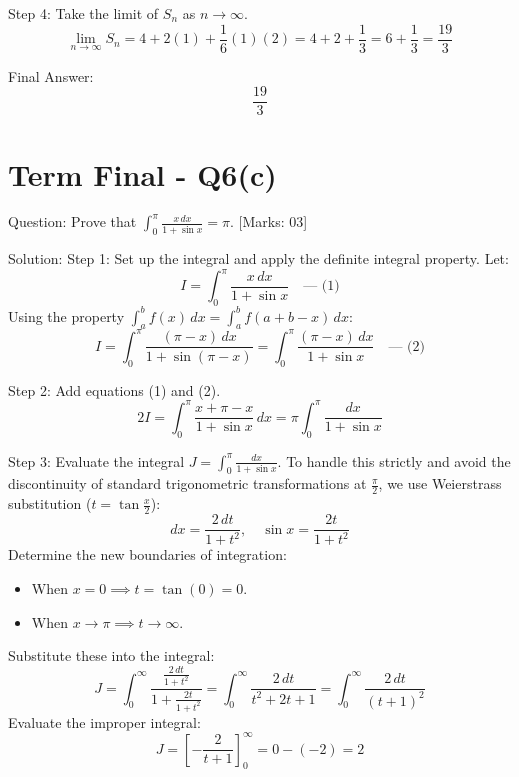 \documentclass[11pt, a4paper]{article}
\begin{document}
Step 4: Take the limit of $S_n$ as $n \to \infty$.
\[
\lim_{n \to \infty} S_n = 4 + 2(1) + \frac{1}{6}(1)(2) = 4 + 2 + \frac{1}{3} = 6 + \frac{1}{3} = \frac{19}{3}
\]

Final Answer:
\[
\boxed{\frac{19}{3}}
\]





\section*{Term Final - Q6(c)}

Question:
Prove that $\int_{0}^{\pi} \frac{x \, dx}{1 + \sin x} = \pi$. [Marks: 03]

Solution:
Step 1: Set up the integral and apply the definite integral property.
Let:
\[
I = \int_{0}^{\pi} \frac{x \, dx}{1 + \sin x} \quad \text{--- (1)}
\]
Using the property $\int_{a}^{b} f(x) \, dx = \int_{a}^{b} f(a+b-x) \, dx$:
\[
I = \int_{0}^{\pi} \frac{(\pi - x) \, dx}{1 + \sin(\pi - x)} = \int_{0}^{\pi} \frac{(\pi - x) \, dx}{1 + \sin x} \quad \text{--- (2)}
\]

Step 2: Add equations (1) and (2).
\[
2I = \int_{0}^{\pi} \frac{x + \pi - x}{1 + \sin x} \, dx = \pi \int_{0}^{\pi} \frac{dx}{1 + \sin x}
\]

Step 3: Evaluate the integral $J = \int_{0}^{\pi} \frac{dx}{1 + \sin x}$.
To handle this strictly and avoid the discontinuity of standard trigonometric transformations at $\frac{\pi}{2}$, we use Weierstrass substitution ($t = \tan \frac{x}{2}$):
\[
dx = \frac{2 \, dt}{1 + t^2}, \quad \sin x = \frac{2t}{1 + t^2}
\]
Determine the new boundaries of integration:
\begin{itemize}
    \item When $x = 0 \implies t = \tan(0) = 0$.
    \item When $x \to \pi \implies t \to \infty$.
\end{itemize}
Substitute these into the integral:
\[
J = \int_{0}^{\infty} \frac{\frac{2 \, dt}{1 + t^2}}{1 + \frac{2t}{1 + t^2}} = \int_{0}^{\infty} \frac{2 \, dt}{t^2 + 2t + 1} = \int_{0}^{\infty} \frac{2 \, dt}{(t + 1)^2}
\]
Evaluate the improper integral:
\[
J = \left[ -\frac{2}{t + 1} \right]_{0}^{\infty} = 0 - (-2) = 2
\]
\end{document}
